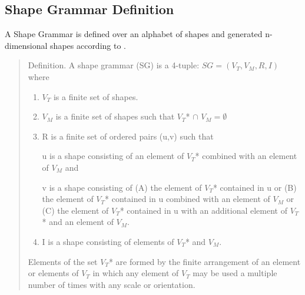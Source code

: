 \subsection{Shape Grammar Definition}
\label{sec:Shape_Grammar_Definition}
A Shape Grammar is defined over an alphabet of shapes and generated n-dimensional shapes according to \citep{shapeGrammars:1972}.
\begin{quote} 
    Definition. A shape grammar (SG) is a 4-tuple: $SG = (V_T, V_M, R, I)$ where
    \begin{enumerate}
        \item $V_T$ is a finite set of shapes.
        \item $V_M$ is a finite set of shapes such that $V_T $* $\cap$  $V_M = \emptyset$
        \item R is a finite set of ordered pairs (u,v) such that
        
        u is a shape consisting of an element of $V_T $* combined with an element of $V_M$ and
        
        v is a shape consisting of (A) the element of $V_T $* contained in u or (B) the element of $V_T $* contained in u combined with an element of $V_M$ or (C) the element of $V_T $* contained in u with an additional element of $V_T$* and an element of $V_M$.
        
        \item I is a shape consisting of elements of $V_T $* and $V_M$.
    \end{enumerate}
    Elements of the set $V_T $* are formed by the finite arrangement of an element or elements of $V_T$ in which any element of $V_T$ may be used a multiple number of times with any scale or orientation.
\end{quote}

